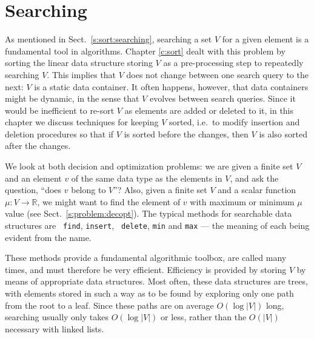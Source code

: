 \documentclass[a4paper]{book}
\theoremstyle{changebreak}                %
\begin{document}
\chapter{Searching}
\label{c:search}

\begin{center}
\end{center}

As mentioned in Sect.~\ref{s:sort:searching},
searching a set $V$ for a given element is a
fundamental tool in algorithms. Chapter \ref{c:sort} dealt with this
problem by sorting the linear data
structure storing $V$ as a pre-processing
step to repeatedly searching $V$. This implies that $V$ does not
change between one search query to the next: $V$
is a static data container. It often
happens, however, that data containers might be
dynamic, in the sense that $V$ evolves
between search queries. Since it would be
inefficient to re-sort $V$ as elements are added or deleted to it, in
this chapter we discuss techniques for keeping $V$
sorted, i.e.~to modify insertion and deletion procedures
so that if $V$ is sorted before the changes, then $V$ is also sorted
after the changes.

We look at both decision and optimization problems: we are given a
finite set $V$ and an element $v$ of the same data
type as the elements in $V$, and ask the question,
``does $v$ belong to $V$''?  Also, given a finite set $V$ and a scalar
function $\mu:V\to\mathbb{R}$, we might want to find the element of
$v$ with maximum or minimum $\mu$ value (see
Sect.~\ref{s:problem:decopt}). The typical methods for searchable data
structures are {\tt
  find}, {\tt insert}, {\tt
  delete}, {\tt min} and {\tt max}
--- the meaning of each being evident from the name.

These methods provide a fundamental algorithmic toolbox, are called
many times, and must therefore be very efficient. Efficiency is
provided by storing $V$ by means of appropriate data
structures. Most often, these data structures
are trees, with elements stored in such a way as to be
found by exploring only one path from the root
to a leaf. Since these paths are on average $O(\log |V|)$
long, searching usually only takes $O(\log|V|)$ or less, rather than
the $O(|V|)$ necessary with linked lists.
\end{document}
